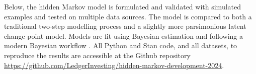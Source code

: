 Below, the hidden Markov model is formulated
and validated with simulated examples and 
tested on multiple data sources. 
The model is compared to both a traditional
two-step modelling process and a slightly
more parsimonious latent
change-point model.
Models are fit using Bayesian estimation
and following a modern Bayesian
workflow \citep{gelman2020}.
All Python and Stan code, and all datasets, to 
reproduce the results
are accessible at the Github repository
\url{https://github.com/LedgerInvesting/hidden-markov-development-2024}.

